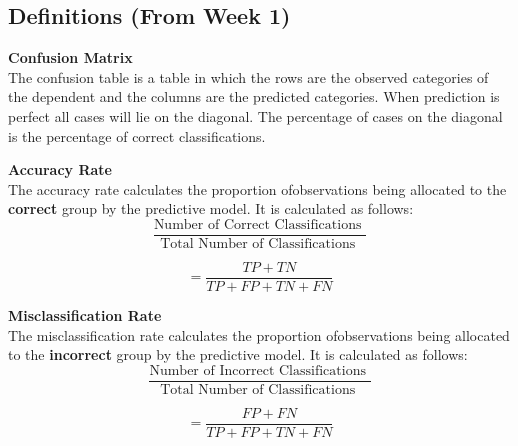 \documentclass[a4paper,12pt]{article}
\begin{document}
\subsection{Definitions (From Week 1)}
\textbf{Confusion Matrix} \\
The confusion
table is a table in which the rows are the observed categories of the dependent and
the columns are the predicted categories. When prediction is perfect all cases will lie on the
diagonal. The percentage of cases on the diagonal is the percentage of correct classifications. 

\textbf{Accuracy Rate}\\
The accuracy rate calculates the proportion ofobservations being allocated to the \textbf{correct} group by the predictive model. It is calculated as follows:
\[ \frac{
\mbox{Number of Correct Classifications }}{\mbox{Total Number of Classifications }} \]

\[ = \frac{TP + TN}{TP+FP+TN+FN}\]

\medskip

\noindent \textbf{Misclassification Rate}\\
The misclassification rate calculates the proportion ofobservations being allocated to the \textbf{incorrect} group by the predictive model. It is calculated as follows:
\[ \frac{
\mbox{Number of Incorrect Classifications }}{\mbox{Total Number of Classifications }} \]

\[ = \frac{FP + FN}{TP+FP+TN+FN}\]
\newpage
\end{document}
